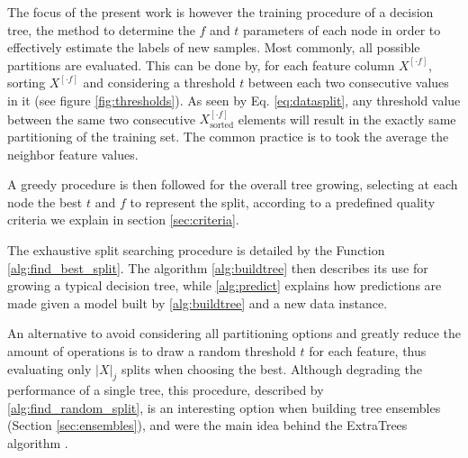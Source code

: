 \documentclass[conference]{IEEEtran}
\newcommand{\el}[1]{^{[#1]}}
\begin{document}
The focus of the present work is however the training procedure of a decision tree, the method to determine the $f$ and $t$ parameters of each node in order to effectively estimate the labels of new samples. Most commonly, all possible partitions are evaluated.
This can be done by, for each feature column $X\el{\cdot f}$, sorting $X\el{\cdot f}$ and considering a threshold $t$ between each two consecutive values in it (see figure \ref{fig:thresholds}). As seen by Eq. \ref{eq:datasplit}, any threshold value between the same two consecutive $X\el{\cdot f}_\text{sorted}$ elements will result in the exactly same partitioning of the training set. The common practice is to took the average the neighbor feature values.

A greedy procedure is then followed for the overall tree growing, selecting at each node the best $t$ and $f$ to represent the split, according to a predefined quality criteria we explain in section \ref{sec:criteria}. 

The exhaustive split searching procedure is detailed by the Function \ref{alg:find_best_split}. The algorithm \ref{alg:buildtree} then describes its use for growing a typical decision tree, while \ref{alg:predict} explains how predictions are made given a model built by \ref{alg:buildtree} and a new data instance.

An alternative to avoid considering all partitioning options and greatly reduce the amount of operations is to draw a random threshold $t$ for each feature, thus evaluating only $|X|_j$ splits when choosing the best. Although degrading the performance of a single tree, this procedure, described by \ref{alg:find_random_split}, is an interesting option when building tree ensembles (Section \ref{sec:ensembles}), and were the main idea behind the ExtraTrees algorithm \cite{}.

%
\end{document}
